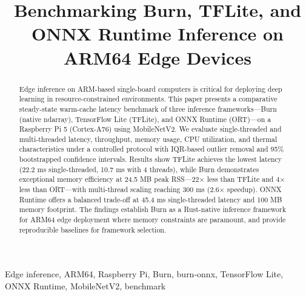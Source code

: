 \documentclass[conference]{IEEEtran}
\begin{document}
\title{Benchmarking Burn, TFLite, and ONNX Runtime Inference on ARM64 Edge Devices}

\author{
}

\maketitle

\begin{abstract}
Edge inference on ARM-based single-board computers is critical for deploying deep learning in resource-constrained environments. This paper presents a comparative steady-state warm-cache latency benchmark of three inference frameworks---Burn (native ndarray), TensorFlow Lite (TFLite), and ONNX Runtime (ORT)---on a Raspberry Pi 5 (Cortex-A76) using MobileNetV2. We evaluate single-threaded and multi-threaded latency, throughput, memory usage, CPU utilization, and thermal characteristics under a controlled protocol with IQR-based outlier removal and 95\% bootstrapped confidence intervals. Results show TFLite achieves the lowest latency (22.2 ms single-threaded, 10.7 ms with 4 threads), while Burn demonstrates exceptional memory efficiency at 24.5 MB peak RSS---22$\times$ less than TFLite and 4$\times$ less than ORT---with multi-thread scaling reaching 300 ms (2.6$\times$ speedup). ONNX Runtime offers a balanced trade-off at 45.4 ms single-threaded latency and 100 MB memory footprint. The findings establish Burn as a Rust-native inference framework for ARM64 edge deployment where memory constraints are paramount, and provide reproducible baselines for framework selection.
\end{abstract}

\begin{IEEEkeywords}
Edge inference, ARM64, Raspberry Pi, Burn, burn-onnx, TensorFlow Lite, ONNX Runtime, MobileNetV2, benchmark
\end{IEEEkeywords}
\end{document}

